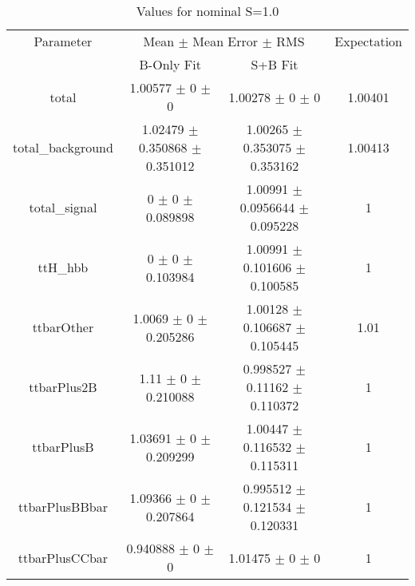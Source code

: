\begin{table}
\centering
\caption{Values for nominal S=1.0}
\begin{tabular}{cccc}
\toprule
Parameter & \multicolumn{2}{c}{Mean $\pm$ Mean Error $\pm$ RMS} & Expectation\\
 & B-Only Fit & S+B Fit & \\
\midrule
total & \num{1.00577} $\pm$ \num{0} $\pm$ \num{0} & \num{1.00278} $\pm$ \num{0} $\pm$ \num{0} & \num{1.00401}\\
total\_background & \num{1.02479} $\pm$ \num{0.350868} $\pm$ \num{0.351012} & \num{1.00265} $\pm$ \num{0.353075} $\pm$ \num{0.353162} & \num{1.00413}\\
total\_signal & \num{0} $\pm$ \num{0} $\pm$ \num{0.089898} & \num{1.00991} $\pm$ \num{0.0956644} $\pm$ \num{0.095228} & \num{1}\\
ttH\_hbb & \num{0} $\pm$ \num{0} $\pm$ \num{0.103984} & \num{1.00991} $\pm$ \num{0.101606} $\pm$ \num{0.100585} & \num{1}\\
ttbarOther & \num{1.0069} $\pm$ \num{0} $\pm$ \num{0.205286} & \num{1.00128} $\pm$ \num{0.106687} $\pm$ \num{0.105445} & \num{1.01}\\
ttbarPlus2B & \num{1.11} $\pm$ \num{0} $\pm$ \num{0.210088} & \num{0.998527} $\pm$ \num{0.11162} $\pm$ \num{0.110372} & \num{1}\\
ttbarPlusB & \num{1.03691} $\pm$ \num{0} $\pm$ \num{0.209299} & \num{1.00447} $\pm$ \num{0.116532} $\pm$ \num{0.115311} & \num{1}\\
ttbarPlusBBbar & \num{1.09366} $\pm$ \num{0} $\pm$ \num{0.207864} & \num{0.995512} $\pm$ \num{0.121534} $\pm$ \num{0.120331} & \num{1}\\
ttbarPlusCCbar & \num{0.940888} $\pm$ \num{0} $\pm$ \num{0} & \num{1.01475} $\pm$ \num{0} $\pm$ \num{0} & \num{1}\\
\bottomrule
\end{tabular}
\end{table}